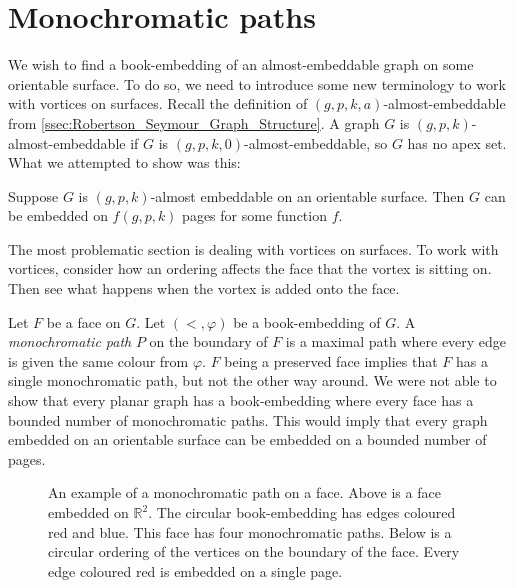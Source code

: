 \section{Monochromatic paths}

We wish to find a book-embedding of an almost-embeddable graph on some orientable surface. To do so, we need to introduce some new terminology to work with vortices on surfaces. 
Recall the definition of $(g, p, k, a)$-almost-embeddable from \cref{ssec:Robertson_Seymour_Graph_Structure}. A graph $G$ is $(g, p, k)$-almost-embeddable if $G$ is $(g, p, k, 0)$-almost-embeddable, so $G$ has no apex set.
What we attempted to show was this:
\begin{theorem}\label{thm:bounded_almost_embeddable}
	Suppose $G$ is $(g, p, k)$-almost embeddable on an orientable surface. Then $G$ can be embedded on \(f(g, p, k)\) pages for some function $f$.
\end{theorem}

The most problematic section is dealing with vortices on surfaces.
To work with vortices, consider how an ordering affects the face that the vortex is sitting on. Then see what happens when the vortex is added onto the face. 

Let \(F\) be a face on \(G\). Let \( (<, \varphi) \) be a book-embedding of \(G\). A \textit{monochromatic path} $P$ on the boundary of $F$ is a maximal path where every edge is given the same colour from $\varphi$. $F$ being a preserved face implies that $F$ has a single monochromatic path, but not the other way around. We were not able to show that every planar graph has a book-embedding where every face has a bounded number of monochromatic paths. This would imply that every graph embedded on an orientable surface can be embedded on a bounded number of pages. 

\begin{figure}[h!]
	\centering
	
	\caption[Monochromatic paths]{An example of a monochromatic path on a face. Above is a face embedded on $\mathbb{R}^2$. The circular book-embedding has edges coloured red and blue. This face has four monochromatic paths. Below is a circular ordering of the vertices on the boundary of the face. Every edge coloured red is embedded on a single page.}
\end{figure}



